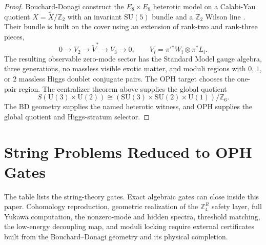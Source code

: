 \documentclass[11pt]{article}
\theoremstyle{remark}
\theoremstyle{plain}
\newcommand{\SU}{\mathrm{SU}}
\newcommand{\U}{\mathrm{U}}
\newcommand{\Z}{\mathbb Z}
\newcommand{\ZfourR}{\mathbb Z_4^R}
\begin{document}
\begin{proof}
Bouchard-Donagi construct the \(E_8\times E_8\) heterotic model on a Calabi-Yau quotient
\(X=\widetilde X/\Z_2\) with an invariant \(\SU(5)\) bundle and a \(\Z_2\) Wilson line
\cite{BouchardDonagi2005}. Their bundle is built on the cover using an extension of rank-two
and rank-three pieces,
\[
0\to V_2\to \widetilde V^\ast\to V_3\to0,
\qquad
V_i=\pi'{}^\ast W_i\otimes\pi^\ast L_i.
\]
The resulting observable zero-mode sector has the Standard Model gauge algebra, three generations,
no massless visible exotic matter, and moduli regions with \(0\), \(1\), or \(2\) massless Higgs
doublet conjugate pairs.
The OPH target chooses the one-pair region. The centralizer theorem above supplies the global
quotient
\[
S(\U(3)\times\U(2))
\cong
(\SU(3)\times\SU(2)\times\U(1))/\Z_6.
\]
The BD geometry supplies the named heterotic witness, and OPH supplies the global quotient
and Higgs-stratum selector.
\end{proof}

\section{String Problems Reduced to OPH Gates}

The table lists the string-theory gates. Exact algebraic gates can close inside this paper.
Cohomology reproduction, geometric realization of the \(\ZfourR\) safety layer, full Yukawa
computation, the nonzero-mode and hidden spectra, threshold matching, the low-energy decoupling
map, and moduli locking require external certificates built from the Bouchard--Donagi geometry
and its physical completion.
\end{document}

